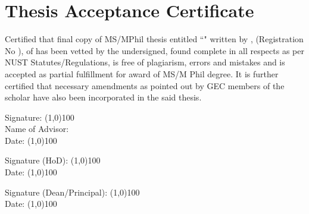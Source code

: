 \chapter*{Thesis Acceptance Certificate}
Certified that final copy of MS/MPhil thesis entitled ``\textbf{\@title}" written by \textbf{\@author}, (Registration No \textbf{\@regno}), of \@school has been vetted by the undersigned, found complete in all respects as per NUST Statutes/Regulations, is free of plagiarism, errors and mistakes and is accepted as partial fulfillment for award of MS/M Phil degree. It is further certified that necessary amendments as pointed out by GEC members of the scholar have also been incorporated in the said thesis.
        
    \begin{flushright}
    Signature: \line(1,0){100}\\
    \vspace*{10pt}\noindent
    Name of Advisor: \textbf{\underline{\@adviser}}\\
    \vspace*{10pt}\noindent
    Date: \line(1,0){100}
    
    Signature (HoD): \line(1,0){100}\\
    \vspace*{10pt}\noindent
    Date:  \line(1,0){100}

    Signature (Dean/Principal): \line(1,0){100}\\
    \vspace*{10pt}\noindent
    Date:  \line(1,0){100}
    \end{flushright}